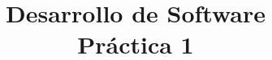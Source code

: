 \documentclass[letterpaper,12pt]{article} %
\date{}
\numberwithin{equation}{section}
\theoremstyle{plain}
\theoremstyle{definition}
\theoremstyle{remark}
\theoremstyle{remark}
\theoremstyle{remark}
\theoremstyle{remark}
\newcommand{\myMateria}{Desarrollo de Software}
\newcommand{\myReport}{Práctica 1}
\begin{document}
    
    \newpage
    \tableofcontents
    \newpage

\title{\myMateria \\\textbf{\myReport} \\ } 

\begin{abstract}
\end{abstract}






% 
\end{document}
